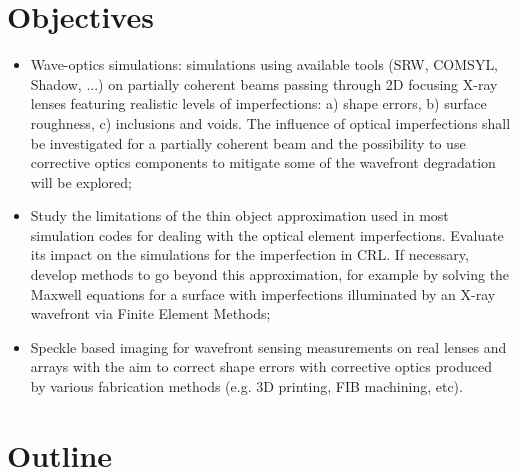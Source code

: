 \section*{Objectives}

\begin{itemize}
\item Wave-optics simulations: simulations using available tools (SRW, COMSYL, Shadow, ...) on partially coherent beams passing through 2D focusing X-ray lenses featuring realistic levels of imperfections: a) shape errors, b) surface roughness, c) inclusions and voids. The influence of optical imperfections shall be investigated for a partially coherent beam and the possibility to use corrective optics components to mitigate some of the wavefront degradation will be explored;

\item Study the limitations of the thin object approximation used in most simulation codes for dealing with the optical element imperfections. Evaluate its impact on the simulations for the imperfection in CRL. If necessary, develop methods to go beyond this approximation, for example by solving the Maxwell equations for a surface with imperfections illuminated by an X-ray wavefront via Finite Element Methods;
	
\item Speckle based imaging for wavefront sensing measurements on real lenses and arrays with the aim to correct shape errors with corrective optics produced by various fabrication methods (e.g. 3D printing, FIB machining, etc).
	
\end{itemize}

\section*{Outline}

